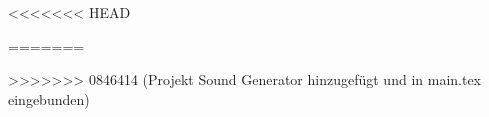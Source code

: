 \documentclass[12pt,a4paper]{report}
\begin{document}




\tableofcontents

\clearpage

%
%
%
%
%
%
% 
%
%








<<<<<<< HEAD



=======
  
>>>>>>> 0846414 (Projekt Sound Generator hinzugefügt und in main.tex eingebunden)
%
%


\end{document}
